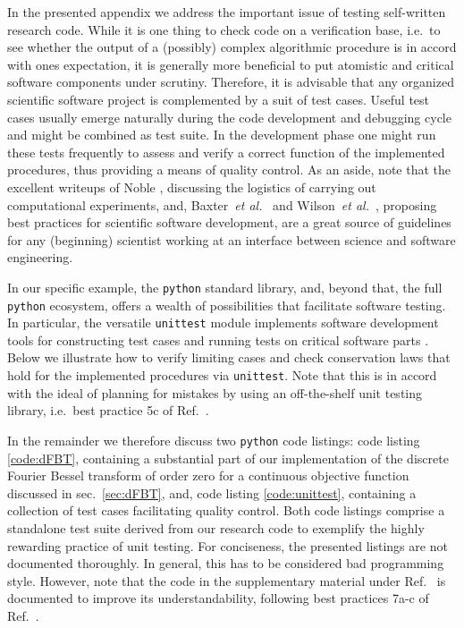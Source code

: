 \documentclass[12pt]{iopart}
\begin{document}
In the presented appendix we address the important issue of testing
self-written research code. While it is one thing to check code on a
verification base, i.e.\ to see whether the output of a (possibly) complex
algorithmic procedure is in accord with ones expectation, it is generally more
beneficial to put atomistic and critical software components under scrutiny.
Therefore, it is advisable that any organized scientific software project is
complemented by a suit of test cases. Useful test cases usually emerge naturally
during the code development and debugging cycle and might be combined as test
suite.  In the development phase one might run these tests frequently to
assess and verify a correct function of the implemented procedures, thus 
providing a means of quality control. 
As an aside, note that the excellent writeups of Noble \cite{Noble:2009},
discussing the logistics of carrying out computational experiments, and,
Baxter~{\emph{et al.}}~\cite{Baxter:2006} and Wilson~{\emph{et
al.}}~\cite{Wilson:2014}, proposing best practices for scientific software
development, are a great source of guidelines for any (beginning) scientist
working at an interface between science and software engineering. 

In our specific example, the {\tt python} standard library, and, beyond that,
the full {\tt python} ecosystem, offers a wealth of possibilities that
facilitate software testing.  In particular, the versatile {\tt unittest}
module implements software development tools for constructing test cases and
running tests on critical software parts \cite{Purcell:2003}.  Below we
illustrate how to verify limiting cases and check conservation laws that hold
for the implemented procedures via {\tt unittest}. Note that this is in accord
with the ideal of planning for mistakes by using an off-the-shelf unit testing
library, i.e.\ best practice 5c of Ref.\ \cite{Wilson:2014}.  

In the remainder we therefore discuss two {\tt{python}} code listings: code
listing \ref{code:dFBT}, containing a substantial part of our implementation of
the discrete Fourier Bessel transform of order zero for a continuous objective
function discussed in sec.\ \ref{sec:dFBT}, and, code listing
\ref{code:unittest}, containing a collection of test cases facilitating quality
control.  Both code listings comprise a standalone test suite derived from our
research code to exemplify the highly rewarding practice of unit testing.  For
conciseness, the presented listings are not documented thoroughly. In general,
this has to be considered bad programming style.  However, note that the code
in the supplementary material under Ref.\ \cite{Melchert_gitHub_dFBT:2016} is
documented to improve its understandability, following best practices 7a-c of
Ref.\ \cite{Wilson:2014}.
\end{document}
